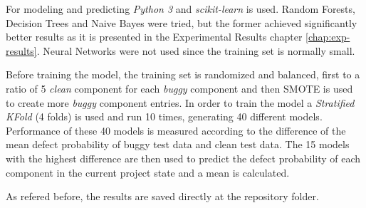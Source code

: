 For modeling and predicting \emph{Python 3} and \emph{scikit-learn} is used.
Random Forests, Decision Trees and Naive Bayes were tried, but the former achieved significantly better results as it is presented in the Experimental Results chapter \ref{chap:exp-results}.
Neural Networks were not used since the training set is normally small.

Before training the model, the training set is randomized and balanced, first to a ratio of 5 \emph{clean} component for each \emph{buggy} component 
and then SMOTE is used to create more \emph{buggy} component entries. In order to train the model a \emph{Stratified KFold} (4 folds) is used and run 10 times, 
generating 40 different models. Performance of these 40 models is measured according to the difference of the mean defect probability of buggy test data and clean test data. 
The 15 models with the highest difference are then used to predict the defect probability of each component in the current project state and a mean is calculated.

As refered before, the results are saved directly at the repository folder.
